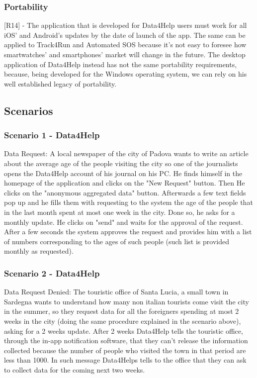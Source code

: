 {\color{secblue}\subsubsection{Portability}}
[R14] - The application that is developed for Data4Help users must work for all iOS' and Android's updates by the date of launch of the app. The same can be applied to Track4Run and Automated SOS because it's not easy to foresee how smartwatches' and smartphones' market will change in the future. The desktop application of Data4Help instead has not the same portability requirements, because, being developed for the Windows operating system, we can rely on his well established legacy of portability.
{\color{secblue}\subsection{Scenarios}}
{\color{secblue}\subsubsection{Scenario 1 - Data4Help}}
Data Request:
A local newspaper of the city of Padova wants to write an article about the average 
age of the people visiting the city so one of the journalists opens the Data4Help account of his journal on his PC.
He finds himself in the homepage of the application and clicks on the "New Request" button. Then He clicks on the "anonymous aggregated data" button.
Afterwards a few text fields pop up and he fills them with requesting to the system the age of the people that in the last month
spent at most one week in the city. Done so, he asks for a monthly update. He clicks on "send" and waits for the approval of the request.
After a few seconds the system approves the request and provides him with a list of numbers corresponding to the ages of such people (such list is provided monthly as requested).


{\color{secblue}\subsubsection{Scenario 2 - Data4Help}}
Data Request Denied:
The touristic office of Santa Lucia, a small town in Sardegna wants to understand how many non italian tourists come visit the city in the summer, so they request data for all the foreigners spending at most 2 weeks in the city (doing the same procedure explained in the scenario above), asking for a 2 weeks update.
After 2 weeks Data4Help tells the touristic office, through the in-app notification software, that they can't release the information collected because the number of people who visited the town in that period are less than 1000.
In such message Data4Helps tells to the office that they can ask to collect data for the coming next two weeks. 

